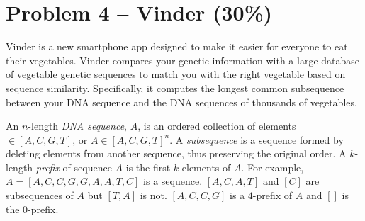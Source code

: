 \documentclass[12pt,letterpaper]{article}
\begin{document}
\newpage

\section*{Problem 4 --  Vinder (30\%)}
Vinder is a new smartphone app designed to make it easier for everyone to eat their vegetables. 
Vinder compares your genetic information with a large database of vegetable genetic sequences to match you with the right vegetable based on sequence similarity. 
Specifically, it computes the longest common subsequence between your DNA sequence and the DNA sequences of thousands of vegetables. 

An $n$-length \textit{DNA sequence}, $A$, is an ordered collection of elements $\in [A,C,G,T]$, or $A\in[A,C,G,T]^n$.
A \textit{subsequence} is a sequence formed by deleting elements from another sequence, thus preserving the original order.
A $k$-length \textit{prefix} of sequence $A$ is the first $k$ elements of $A$.
For example, $A=[A,C,C,G,G,A,A,T,C]$ is a sequence. $[A,C,A,T]$ and $[C]$ are subsequences of $A$ but $[T,A]$ is not. $[A,C,C,G]$ is a $4$-prefix of $A$ and $[ ]$ is the $0$-prefix.
\end{document}
